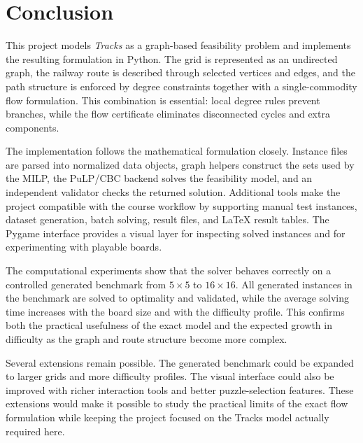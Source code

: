 \section{Conclusion}

This project models \textit{Tracks} as a graph-based feasibility problem and
implements the resulting formulation in Python. The grid is represented as an
undirected graph, the railway route is described through selected vertices and
edges, and the path structure is enforced by degree constraints together with
a single-commodity flow formulation. This combination is essential: local
degree rules prevent branches, while the flow certificate eliminates
disconnected cycles and extra components.

The implementation follows the mathematical formulation closely. Instance
files are parsed into normalized data objects, graph helpers construct the
sets used by the MILP, the PuLP/CBC backend solves the feasibility model, and
an independent validator checks the returned solution. Additional tools make
the project compatible with the course workflow by supporting manual test
instances, dataset generation, batch solving, result files, and LaTeX result
tables. The Pygame interface provides a visual layer for inspecting solved
instances and for experimenting with playable boards.

The computational experiments show that the solver behaves correctly on a
controlled generated benchmark from \(5\times5\) to \(16\times16\). All
generated instances in the benchmark are solved to optimality and validated,
while the average solving time increases with the board size and with the
difficulty profile. This confirms both the practical usefulness of the exact
model and the expected growth in difficulty as the graph and route structure
become more complex.

Several extensions remain possible. The generated benchmark could be expanded
to larger grids and more difficulty profiles. The visual interface could also
be improved with richer interaction tools and better puzzle-selection
features. These extensions would make it possible to study the practical
limits of the exact flow formulation while keeping the project focused on the
Tracks model actually required here.

